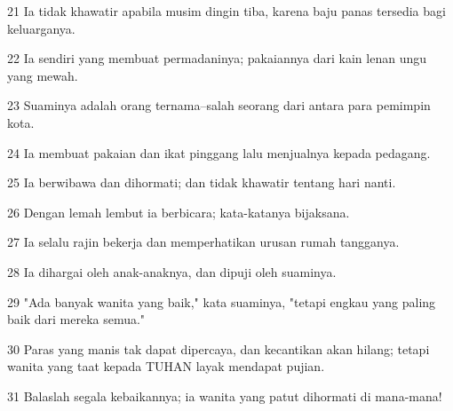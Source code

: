 \par 21 Ia tidak khawatir apabila musim dingin tiba, karena baju panas tersedia bagi keluarganya.
\par 22 Ia sendiri yang membuat permadaninya; pakaiannya dari kain lenan ungu yang mewah.
\par 23 Suaminya adalah orang ternama--salah seorang dari antara para pemimpin kota.
\par 24 Ia membuat pakaian dan ikat pinggang lalu menjualnya kepada pedagang.
\par 25 Ia berwibawa dan dihormati; dan tidak khawatir tentang hari nanti.
\par 26 Dengan lemah lembut ia berbicara; kata-katanya bijaksana.
\par 27 Ia selalu rajin bekerja dan memperhatikan urusan rumah tangganya.
\par 28 Ia dihargai oleh anak-anaknya, dan dipuji oleh suaminya.
\par 29 "Ada banyak wanita yang baik," kata suaminya, "tetapi engkau yang paling baik dari mereka semua."
\par 30 Paras yang manis tak dapat dipercaya, dan kecantikan akan hilang; tetapi wanita yang taat kepada TUHAN layak mendapat pujian.
\par 31 Balaslah segala kebaikannya; ia wanita yang patut dihormati di mana-mana!


